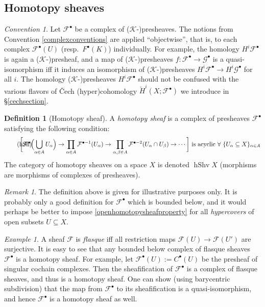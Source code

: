 \documentclass[12pt]{article}
\theoremstyle{definition}
\newtheorem{definition}[theorem]{Definition}
\theoremstyle{remark}
\newtheorem{remark}[theorem]{Remark}
\newtheorem{convention}[theorem]{Convention}
\newtheorem{example}[theorem]{Example}
\numberwithin{equation}{subsection}
\newcommand{\F}{\mathcal F}
\newcommand{\G}{\mathcal G}
\newcommand{\K}{\mathcal K}
\newcommand{\cH}{\check H}
\newcommand{\hShv}{\operatorname{hShv}}
\begin{document}
\subsection{Homotopy sheaves}\label{homotopysheafintro}

\begin{convention}
Let $\F^\bullet$ be a complex of ($\K$-)presheaves.  The notions from Convention \ref{complexconventions} are applied ``objectwise'', that is, to each complex $\F^\bullet(U)$ (resp.\ $F^\bullet(K)$) individually.  For example, the homology $H^i\F^\bullet$ is again a ($\K$-)presheaf, and a map of ($\K$-)presheaves $f:\F^\bullet\to\G^\bullet$ is a quasi-isomorphism iff it induces an isomorphism of ($\K$-)presheaves $H^i\F^\bullet\to H^i\G^\bullet$ for all $i$.  The homology ($\K$-)presheaves $H^i\F^\bullet$ should not be confused with the various flavors of \v Cech (hyper)cohomology $\cH^i(X;\F^\bullet)$ we introduce in \S\ref{cechsection}.
\end{convention}

\begin{definition}[Homotopy sheaf]
A \emph{homotopy sheaf} is a complex of presheaves $\F^\bullet$ satisfying the following condition:
\begin{equation*}
\tag{hSh}\label{openhomotopysheafproperty}\hspace{-20pt}\biggl[\F^\bullet\Bigl(\bigcup_{\alpha\in A}U_\alpha\Bigr)\to\prod_{\alpha\in A}\F^{\bullet-1}(U_\alpha)\to\prod_{\alpha,\beta\in A}\F^{\bullet-2}(U_\alpha\cap U_\beta)\to\cdots\biggr]\text{ is acyclic }\forall\text{ }\{U_\alpha\subseteq X\}_{\alpha\in A}
\end{equation*}
The category of homotopy sheaves on a space $X$ is denoted $\hShv X$ (morphisms are morphisms of complexes of presheaves).
\end{definition}

\begin{remark}
The definition above is given for illustrative purposes only.  It is probably only a good definition for $\F^\bullet$ which is bounded below, and it would perhaps be better to impose \eqref{openhomotopysheafproperty} for all \emph{hypercovers} of open subsets $U\subseteq X$.
\end{remark}

\begin{example}\label{flasquehomotopysheafresolution}
A sheaf $\F$ is \emph{flasque} iff all restriction maps $\F(U)\to\F(U')$ are surjective.  It is easy to see that any bounded below complex of flasque sheaves $\F^\bullet$ is a homotopy sheaf.  For example, let $\F^\bullet(U):=C^\bullet(U)$ be the presheaf of singular cochain complexes.  Then the sheafification of $\F^\bullet$ is a complex of flasque sheaves, and thus is a homotopy sheaf.  One can show (using barycentric subdivision) that the map from $\F^\bullet$ to its sheafification is a quasi-isomorphism, and hence $\F^\bullet$ is a homotopy sheaf as well.
\end{example}
\end{document}
